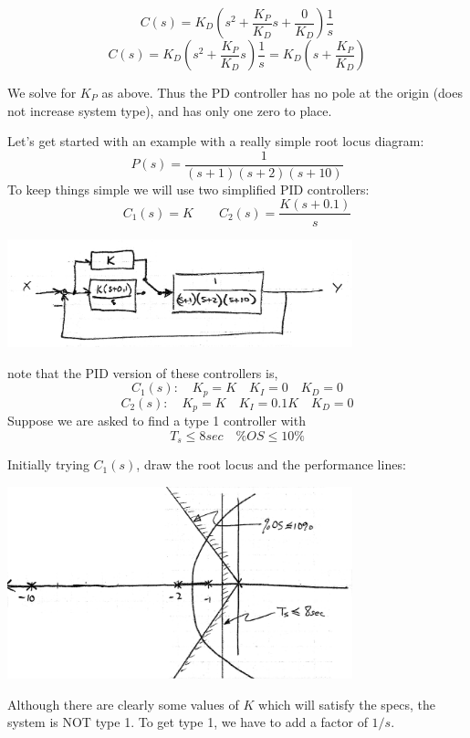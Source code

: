 \[
C(s) = K_D \left ( s^2+ \frac{K_P}{K_D}s + \frac{0}{K_D} \right ) \frac{1}{s}
\]
 \[
 C(s) = K_D \left ( s^2+ \frac{K_P}{K_D}s \right ) \frac{1}{s} = K_D\left ( s+\frac {K_P}  {K_D} \right )
 \]

We solve for $K_P$ as above.
Thus the PD controller has no pole at the origin (does not increase
 system type), and has only one zero to place.


\begin{Example}
Let's get started with an example with a really simple root locus diagram:
\[
P(s) = \frac  {1}   {(s+1)(s+2)(s+10)}
\]
To keep things simple we will use two simplified PID controllers:
\[
C_1(s) = K \qquad   C_2(s) = \frac   {K(s+0.1)} {s}
\]

\includegraphics[width=100mm]{figs09/01107.png}

note that the PID version of these controllers is,
\[
C_1(s):  \quad K_p = K \quad K_I = 0 \quad K_D = 0
\]
\[
C_2(s):  \quad K_p = K \quad K_I = 0.1K \quad K_D = 0
\]
Suppose we are asked  to find a type 1 controller with
\[
T_s \leq 8sec \quad \%OS \leq 10\%
\]

Initially trying $C_1(s)$, draw the root locus and the performance lines:

\includegraphics[width=100mm]{figs09/01108.png}

Although   there are clearly some values of $K$ which will satisfy the specs, the system is NOT type 1.
To get type 1, we have to add a factor of $1/s$.
\end{Example}
